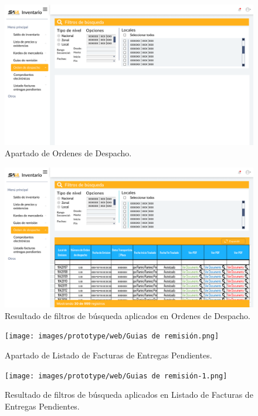 \documentclass{scrreprt}
\begin{document}
    
    \begin{figure}[!htpb]
        \centerline{\includegraphics[scale=.22]{images/prototype/web/Ordenes de despacho.png}}
        \caption{Apartado de Ordenes de Despacho.}
        \label{fig}
    \end{figure}
    \FloatBarrier
    \begin{figure}[!htpb]
        \centerline{\includegraphics[scale=.22]{images/prototype/web/Ordenes de despacho 2.png}}
        \caption{Resultado de filtros de búsqueda aplicados en Ordenes de Despacho.}
        \label{fig}
    \end{figure}
    \FloatBarrier
    
    
    \begin{figure}[!htpb]
        \centerline{\texttt{[image: images/prototype/web/Guias de remisión.png]}}
        \caption{Apartado de Listado de Facturas de Entregas Pendientes.}
        \label{fig}
    \end{figure}
    \FloatBarrier
    \begin{figure}[!htpb]
        \centerline{\texttt{[image: images/prototype/web/Guias de remisión-1.png]}}
        \caption{Resultado de filtros de búsqueda aplicados en Listado de Facturas de Entregas Pendientes.}
        \label{fig}
    \end{figure}
    \FloatBarrier
    
\end{document}
